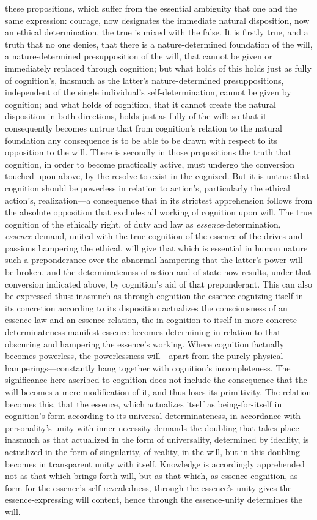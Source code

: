 \documentclass[12pt,a4paper]{book}
\begin{document}
these propositions, which suffer from the essential ambiguity that one and the same expression:
courage, now designates the immediate natural disposition, now an ethical determination, the
true is mixed with the false. It is firstly true, and a truth that no one denies, that there is a
nature-determined foundation of the will, a nature-determined presupposition of the will, that
cannot be given or immediately replaced through cognition; but what holds of this holds just as
fully of cognition's, inasmuch as the latter's nature-determined presuppositions, independent of
the single individual's self-determination, cannot be given by cognition; and what holds of
cognition, that it cannot create the natural disposition in both directions, holds just as fully
of the will; so that it consequently becomes untrue that from cognition's relation to the natural
foundation any consequence is to be able to be drawn with respect to its opposition to the will.
There is secondly in those propositions the truth that cognition, in order to become practically
active, must undergo the conversion touched upon above, by the resolve to exist in the cognized.
But it is untrue that cognition should be powerless in relation to action's, particularly the
ethical action's, realization---a consequence that in its strictest apprehension follows from the
absolute opposition that excludes all working of cognition upon will. The true cognition of the
ethically right, of duty and law as \emph{essence}-determination, \emph{essence}-demand, united with the
true cognition of the essence of the drives and passions hampering the ethical, will give that
which is essential in human nature such a preponderance over the abnormal hampering that the
latter's power will be broken, and the determinateness of action and of state now results, under
that conversion indicated above, by cognition's aid of that preponderant. This can also be
expressed thus: inasmuch as through cognition the essence cognizing itself in its concretion
according to its disposition actualizes the consciousness of an essence-law and an
essence-relation, the in cognition to itself in more concrete determinateness manifest essence
becomes determining in relation to that obscuring and hampering the essence's working. Where
cognition factually becomes powerless, the powerlessness will---apart from the purely physical
hamperings---constantly hang together with cognition's incompleteness. The significance here
ascribed to cognition does not include the consequence that the will becomes a mere modification
of it, and thus loses its primitivity. The relation becomes this, that the essence, which
actualizes itself as being-for-itself in cognition's form according to its universal
determinateness, in accordance with personality's unity with inner necessity demands the doubling
that takes place inasmuch as that actualized in the form of universality, determined by ideality,
is actualized in the form of singularity, of reality, in the will, but in this doubling becomes
in transparent unity with itself. Knowledge is accordingly apprehended not as that which brings
forth will, but as that which, as essence-cognition, as form for the essence's self-revealedness,
through the essence's unity gives the essence-expressing will content, hence through the
essence-unity determines the will.
\end{document}

